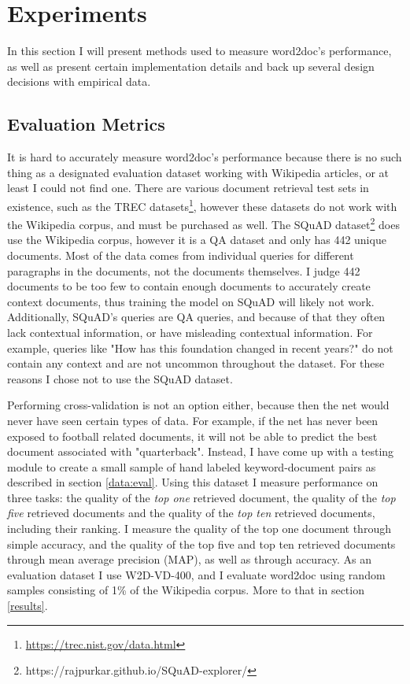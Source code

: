 \chapter{Experiments}
\label{exp}

In this section I will present methods used to measure word2doc's performance, as well as present certain implementation details
and back up several design decisions with empirical data.

\section{Evaluation Metrics}
\label{exp:eval}

It is hard to accurately measure word2doc's performance because there is no such thing as a designated evaluation dataset working
with Wikipedia articles, or at least I could not find one. There are various document retrieval test sets in existence, such as the
TREC datasets\footnote{\url{https://trec.nist.gov/data.html}}, however these datasets do not work with the Wikipedia corpus, and must
be purchased as well. The SQuAD dataset\footnote{https://rajpurkar.github.io/SQuAD-explorer/} does use the Wikipedia corpus,
however it is a QA dataset and only has 442 unique documents. Most of the data comes from individual queries for different
paragraphs in the documents, not the documents themselves. I judge 442 documents to be too few to contain enough documents to
accurately create context documents, thus training the model on SQuAD will likely not work. Additionally, SQuAD's queries
are QA queries, and because of that they often lack contextual information, or have misleading contextual information. For
example, queries like "How has this foundation changed in recent years?" do not contain any context and are not uncommon throughout
the dataset. For these reasons I chose not to use the SQuAD dataset.

Performing cross-validation is not an option either, because then the net would never have seen certain types of
data. For example, if the net has never been exposed to football related documents, it will not be able to predict the best document
associated with "quarterback". Instead, I have come up with a testing module to create a small sample of hand labeled keyword-document
pairs as described in section \ref{data:eval}. Using this dataset I measure performance on three tasks: the quality of the
\textit{top one} retrieved document, the quality of the \textit{top five} retrieved documents and the quality of the \textit{top
ten} retrieved documents, including their ranking. I measure the quality of the top one document through simple accuracy, and the
quality of the top five and top ten retrieved documents through mean average precision (MAP), as well as through accuracy. As an
evaluation dataset I use W2D-VD-400, and I evaluate word2doc using random samples consisting of 1\% of the Wikipedia corpus. More
to that in section \ref{results}.

